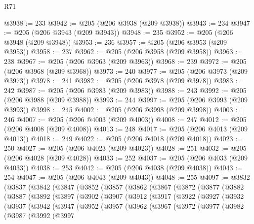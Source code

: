 \begin{lexlean}{R71}
\begin{coremodule}
@3938 := 233
@3942 := @205 (@206 @3938 (@209 @3938))
@3943 := 234
@3947 := @205 (@206 @3943 (@209 @3943))
@3948 := 235
@3952 := @205 (@206 @3948 (@209 @3948))
@3953 := 236
@3957 := @205 (@206 @3953 (@209 @3953))
@3958 := 237
@3962 := @205 (@206 @3958 (@209 @3958))
@3963 := 238
@3967 := @205 (@206 @3963 (@209 @3963))
@3968 := 239
@3972 := @205 (@206 @3968 (@209 @3968))
@3973 := 240
@3977 := @205 (@206 @3973 (@209 @3973))
@3978 := 241
@3982 := @205 (@206 @3978 (@209 @3978))
@3983 := 242
@3987 := @205 (@206 @3983 (@209 @3983))
@3988 := 243
@3992 := @205 (@206 @3988 (@209 @3988))
@3993 := 244
@3997 := @205 (@206 @3993 (@209 @3993))
@3998 := 245
@4002 := @205 (@206 @3998 (@209 @3998))
@4003 := 246
@4007 := @205 (@206 @4003 (@209 @4003))
@4008 := 247
@4012 := @205 (@206 @4008 (@209 @4008))
@4013 := 248
@4017 := @205 (@206 @4013 (@209 @4013))
@4018 := 249
@4022 := @205 (@206 @4018 (@209 @4018))
@4023 := 250
@4027 := @205 (@206 @4023 (@209 @4023))
@4028 := 251
@4032 := @205 (@206 @4028 (@209 @4028))
@4033 := 252
@4037 := @205 (@206 @4033 (@209 @4033))
@4038 := 253
@4042 := @205 (@206 @4038 (@209 @4038))
@4043 := 254
@4047 := @205 (@206 @4043 (@209 @4043))
@4048 := 255
@4097 := @3832
    (@3837
      (@3842
        (@3847
          (@3852
            (@3857
              (@3862
                (@3867
                  (@3872
                    (@3877
                      (@3882
                        (@3887
                          (@3892
                            (@3897
                              (@3902
                                (@3907
                                  (@3912
                                    (@3917
                                      (@3922
                                        (@3927
                                          (@3932
                                            (@3937
                                              (@3942
                                                (@3947
                                                  (@3952
                                                    (@3957
                                                      (@3962
                                                        (@3967
                                                          (@3972
                                                            (@3977
                                                              (@3982
                                                                (@3987
                                                                  (@3992
                                                                    (@3997

\end{coremodule}
\end{lexlean}
